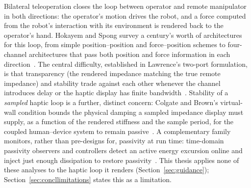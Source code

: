 \documentclass[12pt,a4paper,twoside,openright]{report}
\begin{document}
Bilateral teleoperation closes the loop between operator and remote manipulator in both directions: the operator's motion drives the robot, and a force computed from the robot's interaction with its environment is rendered back to the operator's hand. Hokayem and Spong survey a century's worth of architectures for this loop, from simple position--position and force--position schemes to four-channel architectures that pass both position and force information in each direction~\cite{hokayem2006bilateral}. The central difficulty, established in Lawrence's two-port formulation, is that transparency (the rendered impedance matching the true remote impedance) and stability trade against each other whenever the channel introduces delay or the haptic display has finite bandwidth~\cite{lawrence1993stability}. Stability of a \emph{sampled} haptic loop is a further, distinct concern: Colgate and Brown's virtual-wall condition bounds the physical damping a sampled impedance display must supply, as a function of the rendered stiffness and the sample period, for the coupled human--device system to remain passive~\cite{colgate1994factors}. A complementary family monitors, rather than pre-designs for, passivity at run time: time-domain passivity observers and controllers detect an active energy excursion online and inject just enough dissipation to restore passivity~\cite{hannaford2002timedomain,adams1999stablehaptic}. This thesis applies none of these analyses to the haptic loop it renders (Section~\ref{sec:guidance}); Section~\ref{sec:concllimitations} states this as a limitation.
\end{document}
